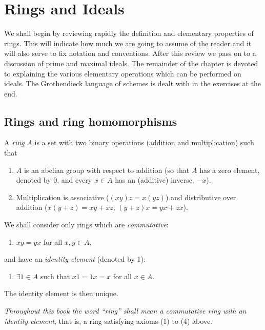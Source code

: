 
\section{Rings and Ideals}

We shall begin by reviewing rapidly the definition and elementary properties of
rings.  This will indicate how much we are going to assume of the reader and it
will also serve to fix notation and conventions.  After this review we pass on
to a discussion of prime and maximal ideals.  The remainder of the chapter is
devoted to explaining the various elementary operations which can be performed
on ideals.  The Grothendieck language of schemes is dealt with in the exercises
at the end.

\subsection{Rings and ring homomorphisms}

A \emph{ring} $A$ is a set with two binary operations (addition and multiplication) such
that
\begin{enumerate}
\renewcommand{\labelenumi}{\arabic{enumi})}
\item $A$ is an abelian group with respect to addition (so that $A$ has a zero element,
denoted by 0, and every $x\in A$ has an (additive) inverse, $-x$).
\item Multiplication is associative ($(xy)z=x(yz)$) and distributive over addition
($x(y+z)=xy+xz$, $(y+z)x=yx+zx$).
\end{enumerate}
We shall consider only rings which are \emph{commutative}:
\begin{enumerate}
\renewcommand{\labelenumi}{\arabic{enumi})}
\setcounter{enumi}{2}
\item $xy=yx$ for all $x,y\in A$,
\end{enumerate}
and have an \emph{identity element} (denoted by 1):
\begin{enumerate}
\renewcommand{\labelenumi}{\arabic{enumi})}
\setcounter{enumi}{3}
\item $\exists 1\in A$ such that $x1=1x=x$ for all $x\in A$.
\end{enumerate}
The identity element is then unique.

\emph{Throughout this book the word ``ring'' shall mean a commutative ring with an
identity element}, that is, a ring satisfying axioms (1) to (4) above.

